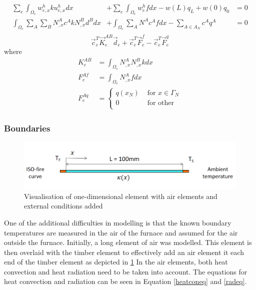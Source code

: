 	\begin{equation}
	\label{heateq4}
	\begin{aligned}
	\sum_e \int_{\Omega_e} w_{e,x}^h k  u_{e,x}^h dx &+ \sum_e \int_{\Omega_e} w_e^h f dx - w(L)q_L + w(0)q_0 &= 0\\
	\int_{\Omega_e} \sum_A \sum_B N_{,x}^A c^A k N_{,x}^B d^B dx  &+ \int_{\Omega_e} \sum_{A} N^A c^A f dx - \sum_{A\in A_N} c^A q^A &= 0\\
	\end{aligned}
	\end{equation}
	\begin{equation}
	\label{heateq5}
	\vec{c}_e^T \vec{K}_e^{AB} \vec{d}_e + \vec{c}_e^T \vec{F}_e^f -\vec{c}_e^T \vec{F}_e^q
	\end{equation}
	where
	\begin{equation*}
	\begin{aligned}
	K_e^{AB} &= \int_{\Omega_e}N_{,x}^AN_{,x}^B k dx\\
	F_e^{Af} &= \int_{\Omega_e}N_{,x}^A f dx\\
	F_e^{Aq} &= \begin{cases} q(x_N) &\text{ for } x \in \Gamma_N\\0 &\text{ for other }\\
	\end{cases}
	\end{aligned}
	\end{equation*}
	
	\subsubsection{Boundaries} \label{airsec}
	\begin{figure}[H]\label{airelmfig}
	\centering
	\includegraphics[width = 0.75\linewidth]{figures/fem_fire_sketch.png}
	\caption{Visualisation of one-dimensional element with air elements and external conditions added}
	\end{figure}
	
	One of the additional difficulties in modelling is that the known boundary temperatures are measured in the air of the furnace and assumed for the air outside the furnace.
	Initially, a long element of air was modelled.
	This element is then overlaid with the timber element to effectively add an air element it each end of the timber element as depicted in \ref{airelmfig}
	In the air elements, both heat convection and heat radiation need to be taken into account.
	The equations for heat convection and radiation can be seen in Equation \ref{heatconeq} and \ref{radeq}.
	
